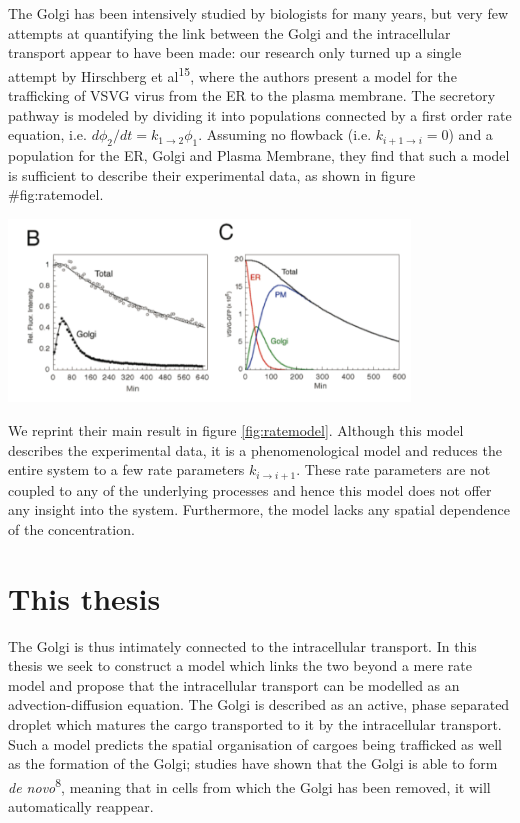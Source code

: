 \documentclass{Dissertate}
\let\origfigure\figure
\let\endorigfigure\endfigure
\renewenvironment{figure}[1][2] {
    \expandafter\origfigure\expandafter[H]
} {
    \endorigfigure
}
\begin{document}
The Golgi has been intensively studied by biologists for many years, but
very few attempts at quantifying the link between the Golgi and the intracellular transport appear to have been made: our
research only turned up a single attempt by Hirschberg et
al\textsuperscript{15}, where the authors present a model for the
trafficking of VSVG virus from the ER to the plasma membrane. The
secretory pathway is modeled by dividing it into populations connected
by a first order rate equation, i.e.
\(d \phi_{2}/dt=k_{1\to2}\phi_{1}\). Assuming no flowback (i.e.
\(k_{i+1\to i}=0\)) and a population for the ER, Golgi and Plasma
Membrane, they find that such a model is sufficient to describe their
experimental data, as shown in figure \#fig:ratemodel.

\begin{figure}
\hypertarget{fig:ratemodel}{%
\centering
\includegraphics[width=0.8\textwidth]{source/figures/png/kineticmodel.png}
\caption{\textbf{Left panel}: First order rate model fitted to
experimental data by 15 \textbf{Right panel}: Inferred concentration in
ER, Golgi and PM using the fitted parameters from the left panel and
their model. Image reprinted from 15.}\label{fig:ratemodel}
}
\end{figure}

We reprint their main result in figure \ref{fig:ratemodel}.
Although this model describes the experimental data, it is a
phenomenological model and reduces the entire system to a few rate
parameters \(k_{i\to i+1}\). These rate parameters are not coupled to
any of the underlying processes and hence this model does not offer any
insight into the system. Furthermore, the model lacks any spatial
dependence of the concentration.

\hypertarget{this-thesis}{%
\section{This thesis}\label{this-thesis}}

The Golgi is thus intimately connected to the intracellular transport. In this thesis we seek to construct a model which links the two beyond a mere rate model and propose that the intracellular transport can be modelled as an advection-diffusion equation. The Golgi is described as an active, phase separated droplet which matures the cargo transported to it by the intracellular transport. Such a model predicts the spatial organisation of cargoes being trafficked as well as the formation of the Golgi; studies have shown that the Golgi is able to form \emph{de novo}\textsuperscript{8}, meaning that in cells from which the Golgi has been removed, it will automatically reappear.  
\end{document}
